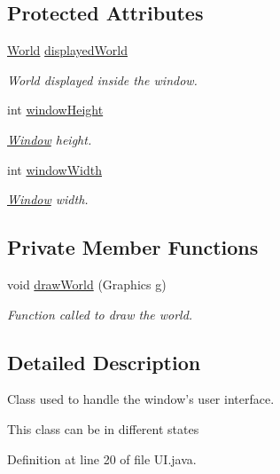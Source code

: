 \subsection*{Protected Attributes}
\begin{DoxyCompactItemize}
\item 
\hyperlink{a00039}{World} \hyperlink{a00034_a964f2be8f2b13b25d66b571325e20757}{displayed\-World}
\begin{DoxyCompactList}\small\item\em World displayed inside the window. \end{DoxyCompactList}\item 
int \hyperlink{a00034_ad1a84d64616615d037c1ebca54647610}{window\-Height}
\begin{DoxyCompactList}\small\item\em \hyperlink{a00037}{Window} height. \end{DoxyCompactList}\item 
int \hyperlink{a00034_a4c35432cda424d024255606d4f95caf2}{window\-Width}
\begin{DoxyCompactList}\small\item\em \hyperlink{a00037}{Window} width. \end{DoxyCompactList}\end{DoxyCompactItemize}
\subsection*{Private Member Functions}
\begin{DoxyCompactItemize}
\item 
void \hyperlink{a00034_ab8622a1cf2ea812537f90a9508bbe394}{draw\-World} (Graphics g)
\begin{DoxyCompactList}\small\item\em Function called to draw the world. \end{DoxyCompactList}\end{DoxyCompactItemize}


\subsection{Detailed Description}
Class used to handle the window's user interface. 

This class can be in different states 

Definition at line 20 of file U\-I.\-java.




